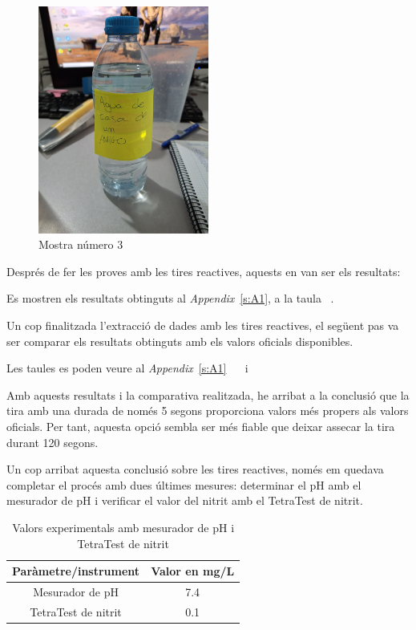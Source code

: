 \begin{figure}[H]
\centering
\includegraphics[width=0.5\textwidth, angle=270]{./Figures/ex3.png}
\caption{Mostra número 3}
\label{fig:Mostra3}
\end{figure}

Després de fer les proves amb les tires reactives, aquests en van ser els resultats:

Es mostren els resultats obtinguts al \textit{Appendix}~\ref{s:A1}, a la taula ~.

Un cop finalitzada l’extracció de dades amb les tires reactives, el següent pas va ser comparar els resultats obtinguts amb els valors oficials disponibles.

Les taules es poden veure al \textit{Appendix}~\ref{s:A1}~ ~ i~

Amb aquests resultats i la comparativa realitzada, he arribat a la conclusió que la tira amb una durada de només 5 segons proporciona valors més propers als valors oficials. Per tant, aquesta opció sembla ser més fiable que deixar assecar la tira durant 120 segons.

Un cop arribat aquesta conclusió sobre les tires reactives, només em quedava completar el procés amb dues últimes mesures: determinar el pH amb el mesurador de pH i verificar el valor del nitrit amb el TetraTest de nitrit.
\begin{table}[H]
\centering
\begin{tabular}{|c|c|}
\hline
Paràmetre/instrument & Valor en mg/L \\
\hline
Mesurador de pH    & 7.4  \\
\hline
TetraTest de nitrit    & 0.1  \\
\hline
\end{tabular}%
\caption{Valors experimentals amb mesurador de pH i TetraTest de nitrit}
\label{tab:valors_tetra_pH}
\end{table}

